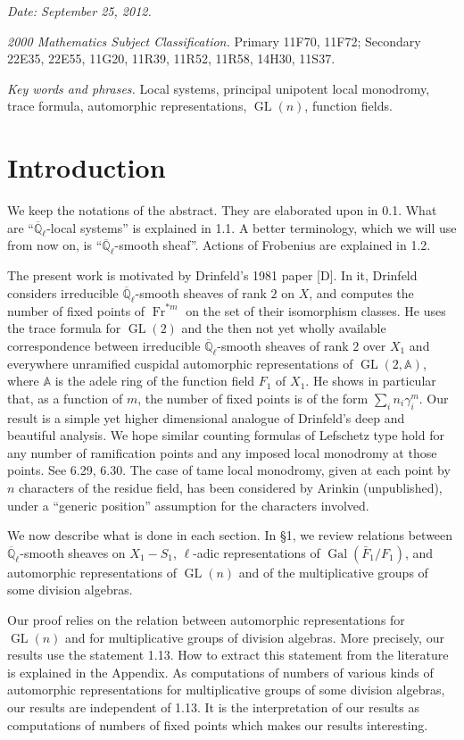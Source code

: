 \documentclass[10pt]{article}
\newcommand{\Ql}{\overline{\mathbb Q}_{\ell}}
\newcommand{\Adele}{\mathbb A}
\newcommand{\GL}{\operatorname{GL}}
\newcommand{\Gal}{\operatorname{Gal}}
\newcommand{\Fr}{\operatorname{Fr}}
\theoremstyle{deligne}
\begin{document}
\textit{Date: September 25, 2012.}

\textit{2000 Mathematics Subject Classification.} Primary 11F70, 11F72; Secondary 22E35, 22E55, 11G20, 11R39, 11R52, 11R58, 14H30, 11S37.

\textit{Key words and phrases.} Local systems, principal unipotent local monodromy, trace formula, automorphic representations, $\GL(n)$, function fields.

\section*{Introduction}

We keep the notations of the abstract. They are elaborated upon in 0.1. What are ``$\Ql$-local systems'' is explained in 1.1. A better terminology, which we will use from now on, is ``$\Ql$-smooth sheaf''. Actions of Frobenius are explained in 1.2.

The present work is motivated by Drinfeld's 1981 paper [D]. In it, Drinfeld considers irreducible $\Ql$-smooth sheaves of rank $2$ on $X$, and computes the number of fixed points of $\Fr^{*m}$ on the set of their isomorphism classes. He uses the trace formula for $\GL(2)$ and the then not yet wholly available correspondence between irreducible $\Ql$-smooth sheaves of rank $2$ over $X_1$ and everywhere unramified cuspidal automorphic representations of $\GL(2,\Adele)$, where $\Adele$ is the adele ring of the function field $F_1$ of $X_1$. He shows in particular that, as a function of $m$, the number of fixed points is of the form $\sum_i n_i\gamma_i^m$. Our result is a simple yet higher dimensional analogue of Drinfeld's deep and beautiful analysis. We hope similar counting formulas of Lefschetz type hold for any number of ramification points and any imposed local monodromy at those points. See 6.29, 6.30. The case of tame local monodromy, given at each point by $n$ characters of the residue field, has been considered by Arinkin (unpublished), under a ``generic position'' assumption for the characters involved.

We now describe what is done in each section. In \S1, we review relations between $\Ql$-smooth sheaves on $X_1-S_1$, $\ell$-adic representations of $\Gal(\bar F_1/F_1)$, and automorphic representations of $\GL(n)$ and of the multiplicative groups of some division algebras.

Our proof relies on the relation between automorphic representations for $\GL(n)$ and for multiplicative groups of division algebras. More precisely, our results use the statement 1.13. How to extract this statement from the literature is explained in the Appendix. As computations of numbers of various kinds of automorphic representations for multiplicative groups of some division algebras, our results are independent of 1.13. It is the interpretation of our results as computations of numbers of fixed points which makes our results interesting.
\end{document}
